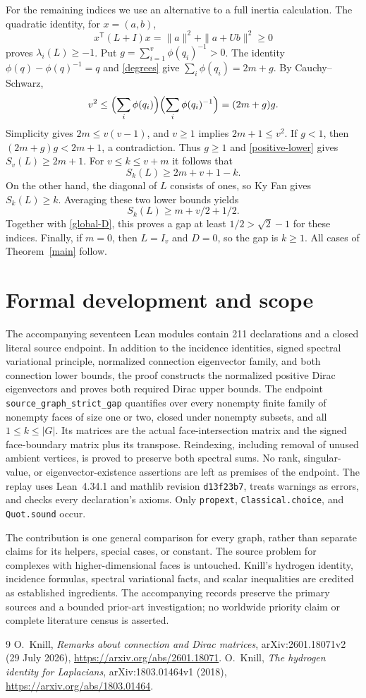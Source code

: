\documentclass[11pt]{article}
\newcommand{\Sk}[2]{S_{#1}(#2)}
\begin{document}
For the remaining indices we use an alternative to a full inertia calculation.
The quadratic identity, for $x=(a,b)$,
\[
 x^{\mathsf T}(L+I)x=\|a\|^2+\|a+Ub\|^2\ge0
\]
proves $\lambda_i(L)\ge-1$.
Put $g=\sum_{i=1}^v\phi(q_i)^{-1}>0$.
The identity $\phi(q)-\phi(q)^{-1}=q$ and \eqref{degrees} give
$\sum_i\phi(q_i)=2m+g$. By Cauchy--Schwarz,
\[
 v^2\le\Bigl(\sum_i\phi(q_i)\Bigr)
             \Bigl(\sum_i\phi(q_i)^{-1}\Bigr)=(2m+g)g.
\]
Simplicity gives $2m\le v(v-1)$, and $v\ge1$ implies $2m+1\le v^2$.
If $g<1$, then $(2m+g)g<2m+1$, a contradiction. Thus $g\ge1$ and
\eqref{positive-lower} gives $\Sk{v}{L}\ge2m+1$.
For $v\le k\le v+m$ it follows that
\[
 \Sk{k}{L}\ge2m+v+1-k.
\]
On the other hand, the diagonal of $L$ consists of ones, so Ky Fan gives
$\Sk{k}{L}\ge k$. Averaging these two lower bounds yields
\[
 \Sk{k}{L}\ge m+v/2+1/2.
\]
Together with \eqref{global-D}, this proves a gap at least
$1/2>\sqrt2-1$ for these indices.
Finally, if $m=0$, then $L=I_v$ and $D=0$, so the gap is $k\ge1$.
All cases of Theorem~\ref{main} follow.

\section{Formal development and scope}
The accompanying seventeen Lean modules contain 211 declarations and a closed
literal source endpoint. In addition to the incidence identities, signed
spectral variational principle, normalized connection eigenvector family,
and both connection lower bounds, the proof constructs the normalized
positive Dirac eigenvectors and proves both required Dirac upper bounds.
The endpoint \texttt{source\_graph\_strict\_gap} quantifies over every nonempty
finite family of nonempty faces of size one or two, closed under nonempty
subsets, and all $1\le k\le|G|$. Its matrices are the actual face-intersection
matrix and the signed face-boundary matrix plus its transpose. Reindexing,
including removal of unused ambient vertices, is proved to preserve both
spectral sums. No rank, singular-value, or eigenvector-existence assertions
are left as premises of the endpoint.
The replay uses Lean~4.34.1 and mathlib revision \texttt{d13f23b7}, treats
warnings as errors, and checks every declaration's axioms. Only
\texttt{propext}, \texttt{Classical.choice}, and \texttt{Quot.sound} occur.

The contribution is one general comparison for every graph, rather than
separate claims for its helpers, special cases, or constant.
The source problem for complexes with higher-dimensional faces is untouched.
Knill's hydrogen identity, incidence formulas, spectral variational facts,
and scalar inequalities are credited as established ingredients.
The accompanying records preserve the primary sources and a bounded prior-art investigation;
no worldwide priority claim or complete literature census is asserted.

\begin{thebibliography}{9}
 O.~Knill,
\emph{Remarks about connection and Dirac matrices},
arXiv:2601.18071v2 (29 July 2026),
\url{https://arxiv.org/abs/2601.18071}.
 O.~Knill,
\emph{The hydrogen identity for Laplacians},
arXiv:1803.01464v1 (2018),
\url{https://arxiv.org/abs/1803.01464}.
\end{thebibliography}
\end{document}
